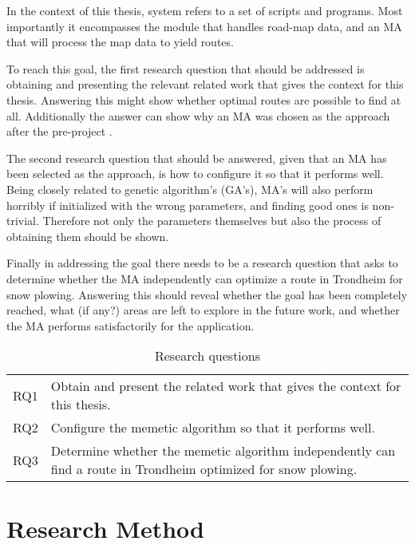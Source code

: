 In the context of this thesis, system refers to a set of scripts and programs. Most importantly it encompasses the module that handles road-map data, and an MA that will process the map data to yield routes.

To reach this goal, the first research question that should be addressed is obtaining and presenting the relevant related work that gives the context for this thesis. Answering this might show whether optimal routes are possible to find at all. Additionally the answer can show why an MA was chosen as the approach after the pre-project \citep{forprosjektet}.

The second research question that should be answered, given that an MA has been selected as the approach, is how to configure it so that it performs well. Being closely related to genetic algorithm's (GA's), MA's will also perform horribly if initialized with the wrong parameters, and finding good ones is non-trivial. Therefore not only the parameters themselves but also the process of obtaining them should be shown.

Finally in addressing the goal there needs to be a research question that asks to determine whether the MA independently can optimize a route in Trondheim for snow plowing. Answering this should reveal whether the goal has been completely reached, what (if any?) areas are left to explore in the future work, and whether the MA performs satisfactorily for the application.

\begin{table}[H]
\centering
\begin{tabular}{cp{}}
RQ1  &  Obtain and present the related work that gives the context for this thesis. \\
RQ2  &  Configure the memetic algorithm so that it performs well.\\
RQ3  &  Determine whether the memetic algorithm independently can find a route in Trondheim optimized for snow plowing. \\
\end{tabular}
\caption{Research questions}
\label{tab:research_questions}
\end{table}

\section{Research Method}

